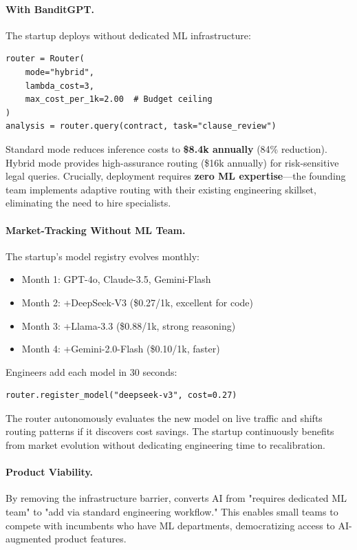 \paragraph{With BanditGPT.} The startup deploys without dedicated ML infrastructure:

\begin{small}
\begin{verbatim}
router = Router(
    mode="hybrid", 
    lambda_cost=3,
    max_cost_per_1k=2.00  # Budget ceiling
)
analysis = router.query(contract, task="clause_review")
\end{verbatim}
\end{small}

Standard mode reduces inference costs to \textbf{\$8.4k annually} (84\% reduction). Hybrid mode provides high-assurance routing (\$16k annually) for risk-sensitive legal queries. Crucially, deployment requires \textbf{zero ML expertise}---the founding team implements adaptive routing with their existing engineering skillset, eliminating the need to hire specialists.

\paragraph{Market-Tracking Without ML Team.}
The startup's model registry evolves monthly:
\begin{itemize}[leftmargin=*,nosep]
    \item Month 1: GPT-4o, Claude-3.5, Gemini-Flash
    \item Month 2: +DeepSeek-V3 (\$0.27/1k, excellent for code)
    \item Month 3: +Llama-3.3 (\$0.88/1k, strong reasoning)
    \item Month 4: +Gemini-2.0-Flash (\$0.10/1k, faster)
\end{itemize}

Engineers add each model in 30 seconds:
\begin{small}
\begin{verbatim}
router.register_model("deepseek-v3", cost=0.27)
\end{verbatim}
\end{small}

The router autonomously evaluates the new model on live traffic and shifts routing patterns if it discovers cost savings. The startup continuously benefits from market evolution without dedicating engineering time to recalibration.

\paragraph{Product Viability.} By removing the infrastructure barrier, \ours{} converts AI from "requires dedicated ML team" to "add via standard engineering workflow." This enables small teams to compete with incumbents who have ML departments, democratizing access to AI-augmented product features.


